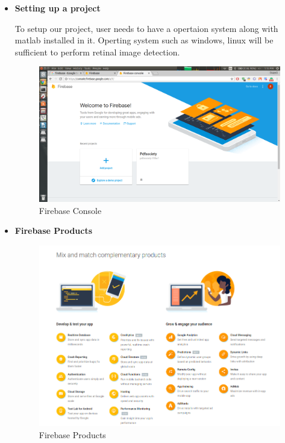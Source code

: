 \begin{itemize}

\item \textbf{Setting up a project}

To setup our project, user needs to have a opertaion system along with matlab installed in it. Operting system such as windows, linux will be sufficient to perform retinal image detection.

\begin{figure}[ht]
\centering
\includegraphics[scale=0.20]{images/Pdf2.png}
\caption{Firebase Console}
\end{figure}

 

\item \textbf{Firebase Products}

\begin{figure}[ht]
\centering
\includegraphics[scale=0.4]{images/Pdf1.png}
\caption{Firebase Products}
\end{figure}


\end{itemize}
